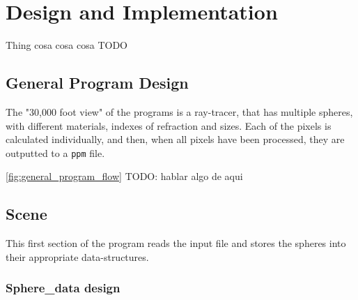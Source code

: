 \chapter{Design and Implementation}\label{chap:design}

Thing cosa cosa cosa TODO

\section{General Program Design}
The "30,000 foot view" of the programs is a ray-tracer, that has multiple spheres, with different materials, indexes of refraction and sizes. Each of the pixels is calculated individually, and then, when all pixels have been processed, they are outputted to a \texttt{ppm} file.

\autoref{fig:general_program_flow} TODO: hablar algo de aqui




\section{Scene}
This first section of the program reads the input file and stores the spheres into their appropriate data-structures. 

\subsection{Sphere\_data design}

